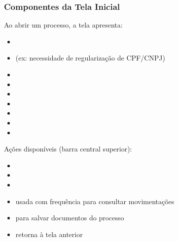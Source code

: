\documentclass[letterpaper,10pt,brazil]{sphinxmanual}
\begin{document}
\subsubsection{Componentes da Tela Inicial}
\label{\detokenize{projud_11_telainicialprocesso:componentes-da-tela-inicial}}
\sphinxAtStartPar
Ao abrir um processo, a tela apresenta:
\begin{itemize}
\item {} 
\sphinxAtStartPar
{}

\item {} 
\sphinxAtStartPar
{} (ex: necessidade de regularização de CPF/CNPJ)

\item {} 
\sphinxAtStartPar
{}

\item {} 
\sphinxAtStartPar
{}

\item {} 
\sphinxAtStartPar
{}

\item {} 
\sphinxAtStartPar
{}

\item {} 
\sphinxAtStartPar
{}

\item {} 
\sphinxAtStartPar
{}

\item {} 
\sphinxAtStartPar
{}

\end{itemize}

\sphinxAtStartPar
Ações disponíveis (barra central superior):
\begin{itemize}
\item {} 
\sphinxAtStartPar
{}

\item {} 
\sphinxAtStartPar
{}

\item {} 
\sphinxAtStartPar
{}

\item {} 
\sphinxAtStartPar
{} \textendash{} usada com frequência para consultar movimentações

\item {} 
\sphinxAtStartPar
{} \textendash{} para salvar documentos do processo

\item {} 
\sphinxAtStartPar
{} \textendash{} retorna à tela anterior

\end{itemize}
\end{document}
